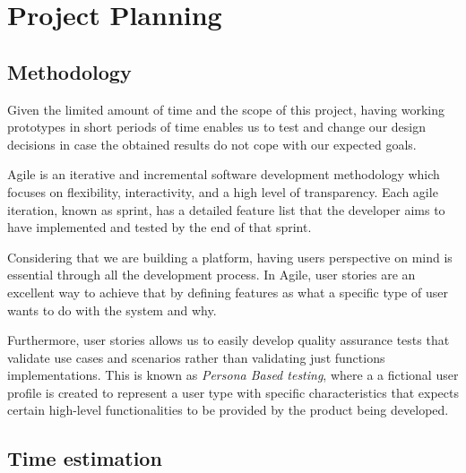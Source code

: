 \chapter{Project Planning}

\section{Methodology}
Given the limited amount of time and the scope of this project, having working prototypes in short periods of time enables us to test and change our design decisions in case the obtained results do not cope with our expected goals.  

Agile is an iterative and incremental software development methodology which focuses on flexibility, interactivity, and a high level of transparency. Each agile iteration, known as sprint, has a detailed feature list that the developer aims to have implemented and tested by the end of that sprint.

Considering that we are building a platform, having users perspective on mind is essential through all the development process. In Agile, user stories are an excellent way to achieve that by defining features as what a specific type of user wants to do with the system and why. 

Furthermore, user stories allows us to easily develop quality assurance tests that validate use cases and scenarios rather than validating just functions implementations. This is known as \textit{Persona Based testing}, where a a fictional user profile is created to represent a user type with specific characteristics that expects certain high-level functionalities to be provided by the product being developed.


\section{Time estimation}